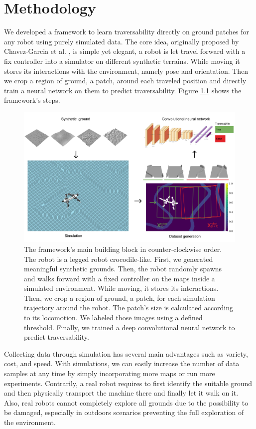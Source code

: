 \documentclass[../document.tex]{subfiles}
\begin{document}
\chapter{Methodology}
\label{chap: methodology}
We developed a framework to learn traversability directly on ground patches for any robot using purely simulated data. The core idea, originally proposed by Chavez-Garcia et al. \cite{omar2018traversability}, is simple yet elegant, a robot is let travel forward with a fix controller into a simulator on different synthetic terrains. While moving it stores its interactions with the environment, namely pose and orientation. Then we crop a region of ground, a patch, around each traveled position and directly train a neural network on them to predict traversability. Figure \ref{fig : pipeline} shows the framework's steps.

\begin{figure} [htbp]
    \centering
        \includegraphics[width=\textwidth]{../img/method.png}
    \caption{The framework's main building block in counter-clockwise order. The robot is a legged robot crocodile-like. First, we generated meaningful synthetic grounds. Then, the robot randomly spawns and walks forward with a fixed controller on the maps inside a simulated environment. While moving, it stores its interactions. Then, we crop a region of ground, a patch, for each simulation trajectory around the robot. The patch's size is calculated according to its locomotion. We labeled those images using a defined threshold. Finally, we trained a deep convolutional neural network to predict traversability.  }
    \label{fig : pipeline}
    \end{figure}
Collecting data through simulation has several main advantages such as variety, cost, and speed. With simulations, we can easily increase the number of data samples at any time by simply incorporating more maps or run more experiments. Contrarily, a real robot requires to first identify the suitable ground and then physically transport the machine there and finally let it walk on it. Also, real robots cannot completely explore all grounds due to the possibility to be damaged, especially in outdoors scenarios preventing the full exploration of the environment. 
\end{document}

